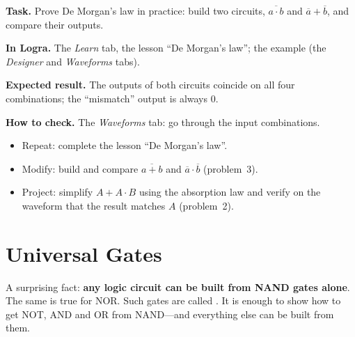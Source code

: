 \begin{diybox}
\textbf{Task.} Prove De Morgan's law in practice: build two circuits,
$\overline{a\cdot b}$ and $\overline{a}+\overline{b}$, and compare their outputs.\par
\textbf{In Logra.} The \emph{Learn} tab, the lesson ``De Morgan's law''; the example
 (the \emph{Designer} and \emph{Waveforms} tabs).\par
\textbf{Expected result.} The outputs of both circuits coincide on all four
combinations; the ``mismatch'' output is always 0.\par
\textbf{How to check.} The \emph{Waveforms} tab: go through the input combinations.
\begin{itemize}[leftmargin=3.4em,labelwidth=3em,labelsep=0.4em,align=left]
  \item[\stars{1}] Repeat: complete the lesson ``De Morgan's law''.
  \item[\stars{2}] Modify: build and compare $\overline{a+b}$ and
    $\overline{a}\cdot\overline{b}$ (problem~3).
  \item[\stars{3}] Project: simplify $A+A\cdot B$ using the absorption law and verify on the
    waveform that the result matches $A$ (problem~2).
\end{itemize}
\end{diybox}

\section{Universal Gates}

A surprising fact: \textbf{any logic circuit can be built from NAND gates
alone}. The same is true for NOR. Such gates are called
. It is enough to show how to get NOT, AND and OR from NAND---and
everything else can be built from them.

